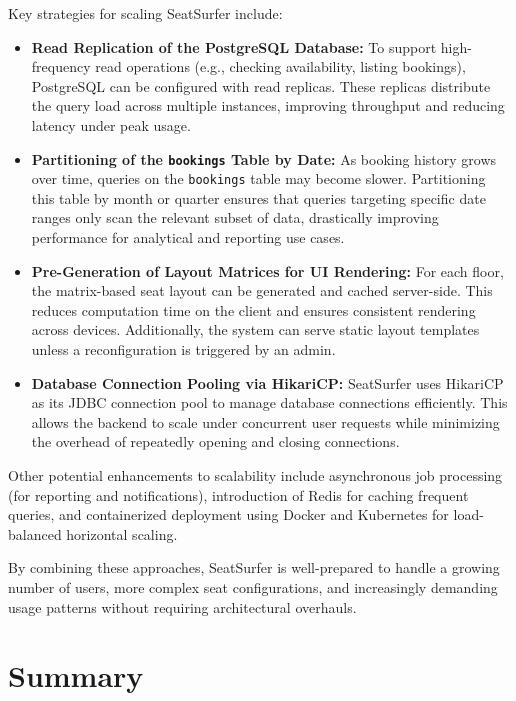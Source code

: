 \documentclass[12pt,a4paper]{report} %
\begin{document}
Key strategies for scaling SeatSurfer include:

\begin{itemize}
    \item \textbf{Read Replication of the PostgreSQL Database:} To support high-frequency read operations (e.g., checking availability, listing bookings), PostgreSQL can be configured with read replicas. These replicas distribute the query load across multiple instances, improving throughput and reducing latency under peak usage.

    \item \textbf{Partitioning of the \texttt{bookings} Table by Date:} As booking history grows over time, queries on the \texttt{bookings} table may become slower. Partitioning this table by month or quarter ensures that queries targeting specific date ranges only scan the relevant subset of data, drastically improving performance for analytical and reporting use cases.

    \item \textbf{Pre-Generation of Layout Matrices for UI Rendering:} For each floor, the matrix-based seat layout can be generated and cached server-side. This reduces computation time on the client and ensures consistent rendering across devices. Additionally, the system can serve static layout templates unless a reconfiguration is triggered by an admin.

    \item \textbf{Database Connection Pooling via HikariCP:} SeatSurfer uses HikariCP as its JDBC connection pool to manage database connections efficiently. This allows the backend to scale under concurrent user requests while minimizing the overhead of repeatedly opening and closing connections.
\end{itemize}

Other potential enhancements to scalability include asynchronous job processing (for reporting and notifications), introduction of Redis for caching frequent queries, and containerized deployment using Docker and Kubernetes for load-balanced horizontal scaling.

By combining these approaches, SeatSurfer is well-prepared to handle a growing number of users, more complex seat configurations, and increasingly demanding usage patterns without requiring architectural overhauls.

\section{Summary}
\end{document}
